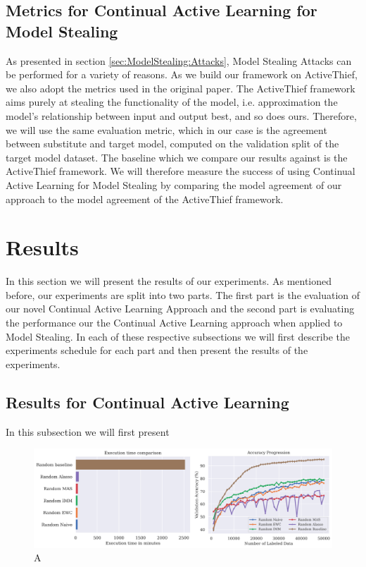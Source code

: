 \subsection{Metrics for Continual Active Learning for Model Stealing}
\label{sec:Evaluation:Metrics:CALMS}
As presented in section \ref{sec:ModelStealing:Attacks}, Model Stealing Attacks can be performed for a variety of reasons. As we build our framework on ActiveThief, we also
adopt the metrics used in the original paper. The ActiveThief framework aims purely at stealing the functionality of the model, i.e. approximation the model's relationship
between input and output best, and so does ours. Therefore, we will use the same evaluation metric, which in our case is the agreement between substitute and target model,
computed on the validation split of the target model dataset. The baseline which we compare our results against is the ActiveThief framework. We will therefore measure the 
success of using Continual Active Learning for Model Stealing by comparing the model agreement of our approach to the model agreement of the ActiveThief framework.

\section{Results}
\label{sec:Evaluation:Results}
In this section we will present the results of our experiments. As mentioned before, our experiments are split into two parts. The first part is the evaluation of our novel
Continual Active Learning Approach and the second part is evaluating the performance our the Continual Active Learning approach when applied to Model Stealing. In each of these
respective subsections we will first describe the experiments schedule for each part and then present the results of the experiments.

\subsection{Results for Continual Active Learning}
\label{sec:Evaluation:Results:CAL}
In this subsection we will first present

\begin{figure} [ht]
    \centering
    \includegraphics[width=\linewidth]{images/results_CAL/Random_CAL_1000b.png}
    \caption[Continual Active Learning Random 1000 batch size]{A}
    \label{fig:Evaluation:Results:CAL:Random1000}
\end{figure}

